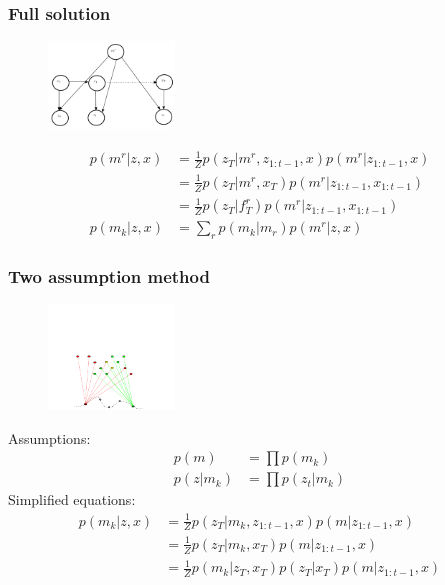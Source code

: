 \documentclass{beamer}
\begin{document}
\begin{frame}
  \frametitle{Full solution}
  \begin{figure}
    \includegraphics[width=0.3\textwidth]{figures/mrf_model_wrapper.pdf}
  \end{figure}
  \begin{align}
    p(m^r|z, x) &= \frac{1}{Z} p(z_T|m^r, z_{1:t-1}, x)p(m^r|z_{1:t-1},x)\\
                &= \frac{1}{Z} p(z_T|m^r, x_T)p(m^r|z_{1:t-1}, x_{1:t-1})\\
                &= \frac{1}{Z} p(z_T|f^r_T)p(m^r|z_{1:t-1}, x_{1:t-1})\\
    p(m_k|z, x) &= \sum_{r}p(m_k|m_r)p(m^r|z, x)
  \end{align}
\end{frame}
\begin{frame}
  \frametitle{Two assumption method}
  \begin{figure}
    \includegraphics[trim=0in 0in 0in 2in, width=0.3\textwidth]{figures/factorgraph/fg_two_assumption.pdf}
  \end{figure}
  Assumptions:
  \begin{align}
    p(m) &= \prod p(m_k)\\
p(z|m_k) &= \prod p(z_t|m_k)
  \end{align}
  Simplified equations:
  \begin{align}
    p(m_k|z, x) &= \frac{1}{Z} p(z_T|m_k, z_{1:t-1}, x)p(m|z_{1:t-1},x)\\
                &= \frac{1}{Z} p(z_T|m_k, x_T)p(m|z_{1:t-1},x)\\
                &= \frac{1}{Z} p(m_k|z_T, x_T)p(z_T|x_T)p(m|z_{1:t-1},x)
  \end{align}
\end{frame}
\end{document}
